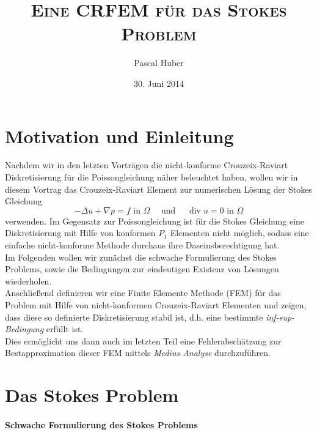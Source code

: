 \documentclass[a4paper]{scrartcl}
\newcommand{\black}{\color{black}}
\newcommand{\blue}{\color{blue}}
\DeclareMathOperator{\divOp}{div}
\theoremstyle{plain}
\theoremstyle{definition}
\theoremstyle{remark}
\begin{document}
\title{\textsc{Eine CRFEM für das Stokes Problem}}
\author{Pascal Huber}
\date{30. Juni 2014}
\maketitle

\section{Motivation und Einleitung}
\label{sec:motiv-und-einl}

\blue 
Nachdem wir in den letzten Vorträgen die nicht-konforme
Crouzeix-Raviart Diskretisierung für die Poissongleichung näher
beleuchtet haben, wollen wir in diesem Vortrag das Crouzeix-Raviart
Element zur numerischen Lösung der Stokes Gleichung
\black
\begin{equation}
  \label{eq:1}
  -\Delta u + \nabla p = f \text{ in } \Omega \quad \text{ und }
  \quad \divOp u = 0 \text{ in } \Omega
\end{equation}
\blue
verwenden. Im Gegensatz zur Poissongleichung ist für die Stokes
Gleichung eine Diskretisierung mit Hilfe von konformen \(P_1\)
Elementen nicht möglich, sodass eine einfache nicht-konforme Methode
durchaus ihre Daseinsberechtigung hat.  \\

\noindent Im Folgenden wollen wir zunächst die schwache Formulierung
des Stokes Problems, sowie die Bedingungen zur eindeutigen Existenz von
Lösungen wiederholen. \\
Anschließend definieren wir eine Finite Elemente
Methode (FEM) für das Problem mit Hilfe von nicht-konformen
Crouzeix-Raviart Elementen und zeigen, dass diese so definierte
Diskretisierung stabil ist, d.h. eine bestimmte \emph{inf-sup-Bedingung}
erfüllt ist. \\
Dies ermöglicht uns dann auch im letzten Teil eine
Fehlerabschätzung zur Bestapproximation dieser FEM mittels \emph{Medius
Analyse} durchzuführen. 



\section{Das Stokes Problem}
\label{sec:das-stokes-problem}

\paragraph{Schwache Formulierung des Stokes Problems}
\label{sec:schw-form-des}
\end{document}
